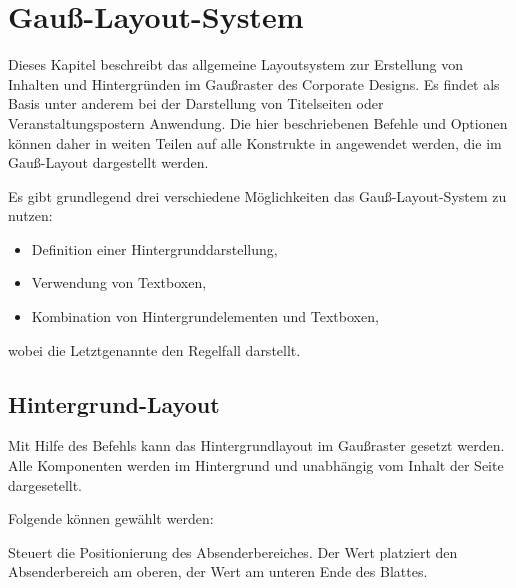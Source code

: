 \chapter{Gauß-Layout-System}\label{chap:gausspage}

Dieses Kapitel beschreibt das allgemeine Layoutsystem zur Erstellung von
Inhalten und Hintergründen im Gaußraster des Corporate Designs.
Es findet als Basis unter anderem bei der Darstellung von Titelseiten oder
Veranstaltungspostern Anwendung. Die hier beschriebenen Befehle und Optionen
können daher in weiten Teilen auf alle Konstrukte in \tubslatex angewendet
werden, die im Gauß-Layout dargestellt werden.

Es gibt grundlegend drei verschiedene Möglichkeiten das Gauß-Layout-System
zu nutzen:
\begin{itemize}
  \item Definition einer Hintergrunddarstellung,
  \item Verwendung von Textboxen,
  \item Kombination von Hintergrundelementen und Textboxen,
\end{itemize}
wobei die Letztgenannte den Regelfall darstellt.

\section{Hintergrund-Layout}\label{sec:gausspage:bglayout}

\begin{Declaration}
\end{Declaration}

Mit Hilfe des Befehls  kann das Hintergrundlayout im Gaußraster gesetzt werden.
Alle Komponenten werden im Hintergrund und unabhängig vom Inhalt der Seite
dargesetellt.

Folgende  können gewählt werden:

\begin{Declaration}
\end{Declaration}

Steuert die Positionierung des Absenderbereiches.
Der Wert  platziert den Absenderbereich am oberen,
der Wert  am unteren Ende des Blattes.

\begin{Declaration}
\end{Declaration}


